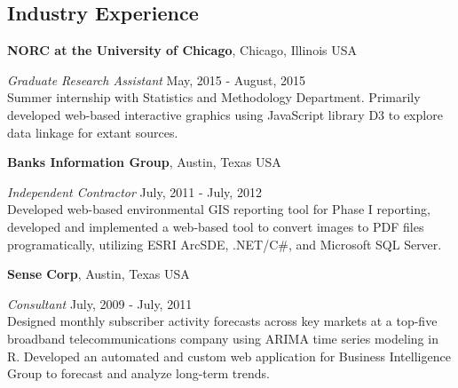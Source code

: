 \documentclass[margin,line]{res}
\begin{document}
\begin{resume}
% 
% 
% 

\section{\sc Industry Experience}
{\bf NORC at the University of Chicago}, Chicago, Illinois USA

\vspace{-.3cm}
{\em Graduate Research Assistant} \hfill {May, 2015 - August, 2015}\\
Summer internship with Statistics and Methodology Department. Primarily developed web-based interactive graphics using JavaScript library D3 to explore data linkage for extant sources. 

{\bf Banks Information Group}, Austin, Texas USA

\vspace{-.3cm}
{\em Independent Contractor} \hfill {July, 2011 - July, 2012}\\
Developed web-based environmental GIS reporting tool for Phase I reporting, developed and implemented a web-based tool to convert images to PDF files programatically, utilizing ESRI ArcSDE, .NET/C\#, and Microsoft SQL Server.

{\bf Sense Corp}, Austin, Texas USA

\vspace{-.3cm}
{\em Consultant} \hfill {July, 2009 - July, 2011}\\
Designed monthly subscriber activity forecasts across key markets at a top-five broadband telecommunications company using ARIMA time series modeling in R. Developed an automated and custom web application for Business Intelligence Group to forecast and analyze long-term trends. %


\end{resume}
\end{document}
